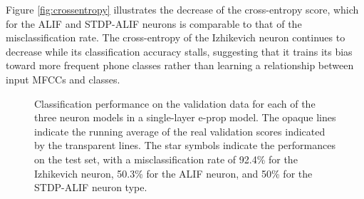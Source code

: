 		Figure \ref{fig:crossentropy} illustrates the decrease of the cross-entropy score, which for the ALIF and STDP-ALIF neurons is comparable to that of the misclassification rate.
		The cross-entropy of the Izhikevich neuron continues to decrease while its classification accuracy stalls, suggesting that it trains its bias toward more frequent phone classes rather than learning a relationship between input MFCCs and classes.

		\begin{figure}[bth]
		    \myfloatalign
		     \quad
		    \caption[Classification performance for each of the three neuron models in a single-layer e-prop model.]{Classification performance on the validation data for each of the three neuron models in a single-layer e-prop model. The opaque lines indicate the running average of the real validation scores indicated by the transparent lines. The star symbols indicate the performances on the test set, with a misclassification rate of 92.4\% for the Izhikevich neuron, 50.3\% for the ALIF neuron, and 50\% for the STDP-ALIF neuron type.}\label{fig:sl-acc}
		\end{figure}


